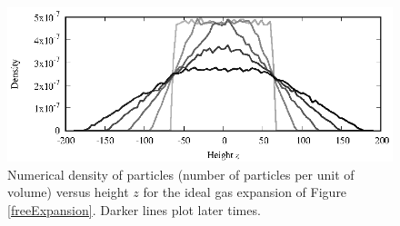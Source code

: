 \begin{figure}
  \includegraphics[width = \textwidth]{figures/density.eps}
  \caption{\label{density}Numerical density of particles (number of particles 
           per unit of volume) versus height $z$ for the ideal gas expansion of 
           Figure \ref{freeExpansion}. Darker lines plot later times.}
\end{figure}

